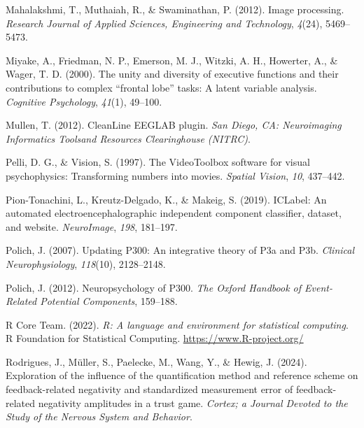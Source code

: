 \documentclass[
  man]{apa7}
\newlength{\cslhangindent}
\newlength{\cslentryspacingunit} %
\newenvironment{CSLReferences}[2] %
 {%
  \setlength{\parindent}{0pt}
  \ifodd #1
  \let\oldpar\par
  \def\par{\hangindent=\cslhangindent\oldpar}
  \fi
  \setlength{\parskip}{#2\cslentryspacingunit}
 }%
 {}
\begin{document}
\begin{CSLReferences}{1}{0}
\leavevmode{}%
Mahalakshmi, T., Muthaiah, R., \& Swaminathan, P. (2012). Image processing. \emph{Research Journal of Applied Sciences, Engineering and Technology}, \emph{4}(24), 5469--5473.

\leavevmode{}%
Miyake, A., Friedman, N. P., Emerson, M. J., Witzki, A. H., Howerter, A., \& Wager, T. D. (2000). The unity and diversity of executive functions and their contributions to complex {``frontal lobe''} tasks: {A} latent variable analysis. \emph{Cognitive Psychology}, \emph{41}(1), 49--100.

\leavevmode{}%
Mullen, T. (2012). {CleanLine} {EEGLAB} plugin. \emph{San Diego, CA: Neuroimaging Informatics Toolsand Resources Clearinghouse (NITRC)}.

\leavevmode{}%
Pelli, D. G., \& Vision, S. (1997). The {VideoToolbox} software for visual psychophysics: {Transforming} numbers into movies. \emph{Spatial Vision}, \emph{10}, 437--442.

\leavevmode{}%
Pion-Tonachini, L., Kreutz-Delgado, K., \& Makeig, S. (2019). {ICLabel}: {An} automated electroencephalographic independent component classifier, dataset, and website. \emph{NeuroImage}, \emph{198}, 181--197.

\leavevmode{}%
Polich, J. (2007). Updating {P300}: An integrative theory of {P3a} and {P3b}. \emph{Clinical Neurophysiology}, \emph{118}(10), 2128--2148.

\leavevmode{}%
Polich, J. (2012). Neuropsychology of {P300}. \emph{The Oxford Handbook of Event-Related Potential Components}, 159--188.

\leavevmode{}%
R Core Team. (2022). \emph{R: A language and environment for statistical computing}. R Foundation for Statistical Computing. \url{https://www.R-project.org/}

\leavevmode{}%
Rodrigues, J., Müller, S., Paelecke, M., Wang, Y., \& Hewig, J. (2024). Exploration of the influence of the quantification method and reference scheme on feedback-related negativity and standardized measurement error of feedback-related negativity amplitudes in a trust game. \emph{Cortex; a Journal Devoted to the Study of the Nervous System and Behavior}.


\end{CSLReferences}
\end{document}

